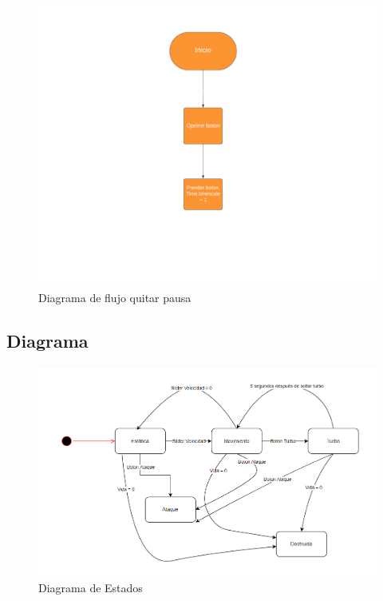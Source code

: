 \documentclass[12pt]{article} %
\begin{document}
\begin{figure}  [!htb]
  \includegraphics[width=\linewidth]{flujo10.png}
  \caption{Diagrama de flujo quitar pausa}
\end{figure}
\FloatBarrier

\subsection{Diagrama}
\begin{figure}  [!htb]
  \includegraphics[width=\linewidth]{DiagramaEstados.png}
  \caption{Diagrama de Estados}
\end{figure}
\newpage
\end{document}
